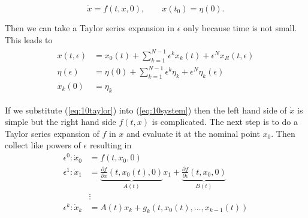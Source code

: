 \begin{equation*}
\dot{x} = f(t,x,0), \qquad x(t_0) = \eta(0).
\end{equation*}

Then we can take a Taylor series expansion in $\epsilon$ only because time is not small.
This leads to
\begin{align}
\label{eq:10taylor}
\begin{split}
x(t,\epsilon) &= x_0(t) + \sum_{k=1}^{N-1}\epsilon^k x_k(t) + \epsilon^N x_R(t,\epsilon) \\
\eta(\epsilon) &= \eta(0) + \sum_{k=1}^{N-1}\epsilon^k\eta_k + \epsilon^N\eta_k(\epsilon) \\
x_k(0) &= \eta_k
\end{split}
\end{align}

If we substitute (\ref{eq:10taylor}) into (\ref{eq:10system}) then the left hand side of $\dot{x}$ is simple but the right hand side $f(t,x)$ is complicated.
The next step is to do a Taylor series expansion of $f$ in $x$ and evaluate it at the nominal point $x_0$.
Then collect like powers of $\epsilon$ resulting in
\begin{align*}
\epsilon^0: \dot{x}_0 &= f(t,x_0,0) \\
\epsilon^1: \dot{x}_1 &= \underbrace{\frac{\partial f}{\partial x}(t,x_0(t),0)}_{A(t)}x_1 + \underbrace{\frac{\partial f}{\partial\epsilon}(t,x_0,0)}_{B(t)} \\
&\vdots \\
\epsilon^k: \dot{x}_k &= A(t)x_k + g_k(t,x_0(t),\ldots,x_{k-1}(t))
\end{align*}
